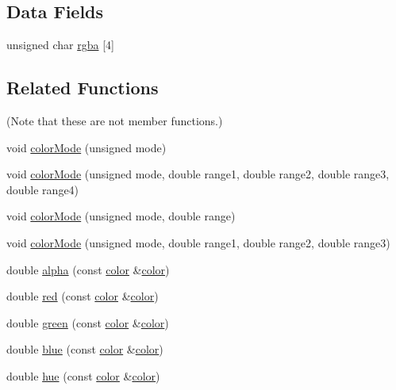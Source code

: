 \subsection*{\-Data \-Fields}
\begin{DoxyCompactItemize}
\item 
unsigned char \hyperlink{classcprocessing_1_1color_ad865cc84a545b713a1d09cd5f85f8e7e}{rgba} \mbox{[}4\mbox{]}
\end{DoxyCompactItemize}
\subsection*{\-Related \-Functions}
(\-Note that these are not member functions.) \begin{DoxyCompactItemize}
\item 
void \hyperlink{classcprocessing_1_1color_aef39a293a2b400a890797662dde3f756}{color\-Mode} (unsigned mode)
\item 
void \hyperlink{classcprocessing_1_1color_a90704ca9808897dedba2f18f8f41a434}{color\-Mode} (unsigned mode, double range1, double range2, double range3, double range4)
\item 
void \hyperlink{classcprocessing_1_1color_afec9a418b6eb9afe82a8ee393f0c18e4}{color\-Mode} (unsigned mode, double range)
\item 
void \hyperlink{classcprocessing_1_1color_a09b8b82d820ab12ac5e69fc776682069}{color\-Mode} (unsigned mode, double range1, double range2, double range3)
\item 
double \hyperlink{classcprocessing_1_1color_a4b8d104207883515b224550dd402db49}{alpha} (const \hyperlink{classcprocessing_1_1color}{color} \&\hyperlink{classcprocessing_1_1color}{color})
\item 
double \hyperlink{classcprocessing_1_1color_a7d4c1cd5bcdc8cc62ff513e10c0ae9eb}{red} (const \hyperlink{classcprocessing_1_1color}{color} \&\hyperlink{classcprocessing_1_1color}{color})
\item 
double \hyperlink{classcprocessing_1_1color_a359eeae13358f01e73db7aa5a40e1662}{green} (const \hyperlink{classcprocessing_1_1color}{color} \&\hyperlink{classcprocessing_1_1color}{color})
\item 
double \hyperlink{classcprocessing_1_1color_a153dd1d1c88660c50d913a179a511d7c}{blue} (const \hyperlink{classcprocessing_1_1color}{color} \&\hyperlink{classcprocessing_1_1color}{color})
\item 
double \hyperlink{classcprocessing_1_1color_a196199ed18da05cc6c5ceff3580dede8}{hue} (const \hyperlink{classcprocessing_1_1color}{color} \&\hyperlink{classcprocessing_1_1color}{color})

\end{DoxyCompactItemize}
